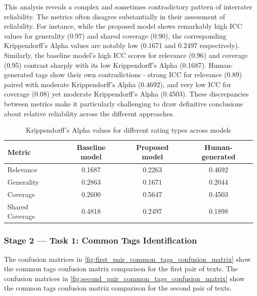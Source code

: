 This analysis reveals a complex and sometimes contradictory pattern of interrater reliability. The metrics often disagree substantially in their assessment of reliability. For instance, while the proposed model shows remarkably high ICC values for generality (0.97) and shared coverage (0.90), the corresponding Krippendorff's Alpha values are notably low (0.1671 and 0.2497 respectively). Similarly, the baseline model's high ICC scores for relevance (0.96) and coverage (0.95) contrast sharply with its low Krippendorff's Alpha (0.1687). Human-generated tags show their own contradictions - strong ICC for relevance (0.89) paired with moderate Krippendorff's Alpha (0.4692), and very low ICC for coverage (0.08) yet moderate Krippendorff's Alpha (0.4503). These discrepancies between metrics make it particularly challenging to draw definitive conclusions about relative reliability across the different approaches.

\begin{table}[htbp]
    \centering
    \begin{tabular}{lccc}
        \hline
        \textbf{Metric} & \textbf{Baseline model} & \textbf{Proposed model} & \textbf{Human-generated} \\
        \hline
        Relevance       & 0.1687            & 0.2263                  & 0.4692                   \\
        Generality      & 0.2863            & 0.1671                  & 0.2044                   \\
        Coverage        & 0.2600            & 0.5647                  & 0.4503                   \\
        Shared Coverage & 0.4818            & 0.2497                  & 0.1898                   \\
        \hline
    \end{tabular}
    \caption{Krippendorff's Alpha values for different rating types across models}
    \label{tab:kalpha}
\end{table}

\subsubsection{Stage 2 — Task 1: Common Tags Identification}
The confusion matrices in \cref{fig:first_pair_common_tags_confusion_matrix} show the common tags confusion matrix comparison for the first pair of texts. The confusion matrices in \cref{fig:second_pair_common_tags_confusion_matrix} show the common tags confusion matrix comparison for the second pair of texts.

